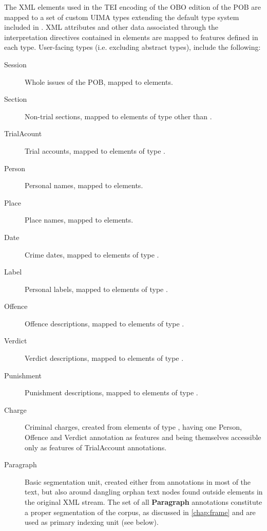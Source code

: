 The XML elements used in the TEI encoding of the OBO edition of the POB are mapped to a set of custom UIMA types extending the default type system included in .
XML attributes and other data associated through the interpretation directives contained in  elements are mapped to features defined in each type.
User-facing types (i.e. excluding abstract types), include the following:

\begin{description}
    \item [Session]     Whole issues of the POB, mapped to  elements.
    \item [Section]     Non-trial sections, mapped to  elements of type other than .
    \item [TrialAcount] Trial accounts, mapped to  elements of type .
    \item [Person]      Personal names, mapped to  elements.
    \item [Place]       Place names, mapped to  elements.
    \item [Date]        Crime dates, mapped to  elements of type .
    \item [Label]       Personal labels, mapped to  elements of type .
    \item [Offence]     Offence descriptions, mapped to  elements of type .
    \item [Verdict]     Verdict descriptions, mapped to  elements of type .
    \item [Punishment]  Punishment descriptions, mapped to  elements of type .
    \item [Charge]      Criminal charges, created from  elements of type , having one Person, Offence and Verdict annotation as features and being themselves accessible only as features of TrialAccount annotations.
    \item [Paragraph]   Basic segmentation unit, created either from  annotations in most of the text, but also around dangling orphan text nodes found outside  elements in the original XML stream.
    The set of all \textbf{Paragraph} annotations constitute a proper segmentation of the corpus, as discussed in \autoref{chap:frame} and are used as primary indexing unit (see below).
\end{description}

